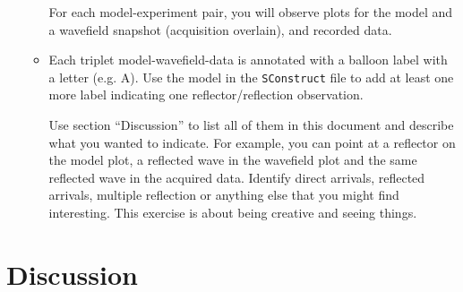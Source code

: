 \begin{enumerate}
\begin{itemize}
For each model-experiment pair, you will observe
plots for the model and a wavefield snapshot (acquisition overlain),
and recorded data.

\item Each triplet model-wavefield-data is annotated with a balloon
label with a letter (e.g. A). Use the model in the 
\texttt{SConstruct} file to add at least one more label 
indicating one reflector/reflection observation.

Use section ``Discussion''
to list all of them in this document and describe what you 
wanted to indicate. For example, you can point at 
a reflector on the model plot,
a reflected wave in the wavefield plot and
the same reflected wave in the acquired data.
Identify direct arrivals, reflected arrivals, multiple reflection or 
anything else that you might find interesting.
This exercise is about being creative and seeing things.

\end{itemize}

\end{enumerate}



\section{Discussion}


